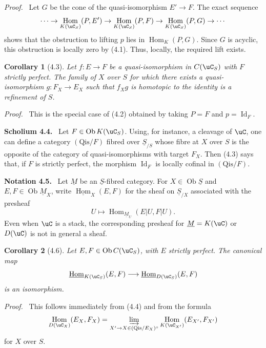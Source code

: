 \documentclass[11pt]{article}
\theoremstyle{plain}
\newtheorem*{corollary*}{Corollary}
\theoremstyle{definition}
\theoremstyle{remark}
\newenvironment{statement}[1]{\par\medskip\noindent\textbf{#1.}\ }{\par\medskip}
\newenvironment{prooftext}{\par\noindent\textit{Proof.}\ }{\par\medskip}
\DeclareMathOperator{\Hom}{Hom}
\DeclareMathOperator{\ob}{Ob}
\providecommand{\uS}{\underline{S}}
\begin{document}
\begin{prooftext}
Let $G$ be the cone of the quasi-isomorphism $E'\to F$. The exact sequence
\[
\cdots\to\Hom_{K(\uC_S)}(P,E')\to
\Hom_{K(\uC_S)}(P,F)\to
\Hom_{K(\uC_S)}(P,G)\to\cdots
\]
shows that the obstruction to lifting $p$ lies in $\Hom_K(P,G)$. Since $G$ is acyclic, this obstruction is locally zero by (4.1). Thus, locally, the required lift exists.
\end{prooftext}

\begin{corollary*}[4.3]
Let $f:E\to F$ be a quasi-isomorphism in $C(\uC_S)$ with $F$ strictly perfect. The family of $X$ over $S$ for which there exists a quasi-isomorphism $g:F_X\to E_X$ such that $f_Xg$ is homotopic to the identity is a refinement of $S$.
\end{corollary*}

\begin{prooftext}
This is the special case of (4.2) obtained by taking $P=F$ and $p=\operatorname{Id}_F$.
\end{prooftext}

\begin{statement}{Scholium 4.4}
Let $F\in\ob K(\uC_S)$. Using, for instance, a cleavage of $\uC$, one can define a category $(\mathrm{Qis}/F)$ fibred over $\uS_{/S}$ whose fibre at $X$ over $S$ is the opposite of the category of quasi-isomorphisms with target $F_X$. Then (4.3) says that, if $F$ is strictly perfect, the morphism $\operatorname{Id}_F$ is locally cofinal in $(\mathrm{Qis}/F)$.
\end{statement}

\begin{statement}{Notation 4.5}
Let $\underline M$ be an $\uS$-fibred category. For $X\in\ob\uS$ and $E,F\in\ob\underline M_X$, write $\underline{\Hom}_X(E,F)$ for the sheaf on $\uS_{/X}$ associated with the presheaf
\[
U\longmapsto \Hom_{\underline M_U}(E|U,F|U).
\]
Even when $\uC$ is a stack, the corresponding presheaf for $\underline M=K(\uC)$ or $D(\uC)$ is not in general a sheaf.
\end{statement}

\begin{corollary*}[4.6]
Let $E,F\in\ob C(\uC_S)$, with $E$ strictly perfect. The canonical map
\[
\underline{\Hom}_{K(\uC_S)}(E,F)\longrightarrow
\underline{\Hom}_{D(\uC_S)}(E,F)
\]
is an isomorphism.
\end{corollary*}

\begin{prooftext}
This follows immediately from (4.4) and from the formula
\[
\Hom_{D(\uC_X)}(E_X,F_X)=
\varinjlim_{X'\to X\in(\mathrm{Qis}/E_X)^\circ}
\Hom_{K(\uC_{X'})}(E_{X'},F_{X'})
\]
for $X$ over $S$.
\end{prooftext}
\end{document}
